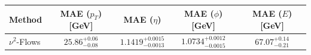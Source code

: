     \begin{tabular}{lcccc}
        \toprule
        Method & MAE ($p_T$) [GeV] & MAE ($\eta$) & MAE ($\phi$) [GeV] & MAE ($E$) [GeV] \\
        \midrule
        $\nu^2$-Flows & $25.86^{+0.06}_{-0.08}$ & $1.1419^{+0.0015}_{-0.0013}$ & $1.0734^{+0.0012}_{-0.0015}$ & $67.07^{+0.14}_{-0.21}$ \\
        \bottomrule
    \end{tabular}